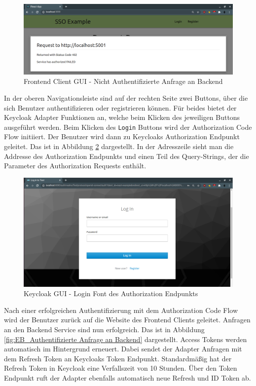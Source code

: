 \begin{figure}[!ht]
	\centering
	\includegraphics[width=1\textwidth]{Images/Ebert/FrontendLoggedOutBackendRequest.PNG}
	\caption{Frontend Client GUI - Nicht Authentifizierte Anfrage an Backend}
	\label{fig:EB_Nicht Authentifizierte Anfrage an Backend}
\end{figure}

In der oberen Navigationsleiste sind auf der rechten Seite zwei Buttons, über die sich Benutzer authentifizieren oder registrieren können. Für beides bietet der Keycloak Adapter Funktionen an, welche beim Klicken des jeweiligen Buttons ausgeführt werden. Beim Klicken des \texttt{Login} Buttons wird der Authorization Code Flow initiiert. Der Benutzer wird dann zu Keycloaks Authorization Endpunkt geleitet. Das ist in Abbildung \ref{fig:EB_Login Font des Authorization Endpunkts} dargestellt. In der Adresszeile sieht man die Addresse des Authorization Endpunkts und einen Teil des Query-Strings, der die Parameter des Authorization Requests enthält.

\begin{figure}[!ht]
	\centering
	\includegraphics[width=1\textwidth]{Images/Ebert/FrontendLoginForm.PNG}
	\caption{Keycloak GUI - Login Font des Authorization Endpunkts}
	\label{fig:EB_Login Font des Authorization Endpunkts}
\end{figure}

Nach einer erfolgreichen Authentifizierung mit dem Authorization Code Flow wird der Benutzer zurück auf die Website des Frontend Clients geleitet. Anfragen an den Backend Service sind nun erfolgreich. Das ist in Abbildung \ref{fig:EB_Authentifizierte Anfrage an Backend} dargestellt. Access Tokens werden automatisch im Hintergrund erneuert. Dabei sendet der Adapter Anfragen mit dem Refresh Token an Keycloaks Token Endpunkt. Standardmäßig hat der Refresh Token in Keycloak eine Verfallszeit von 10 Stunden. Über den Token Endpunkt ruft der Adapter ebenfalls automatisch neue Refresh und ID Token ab.

